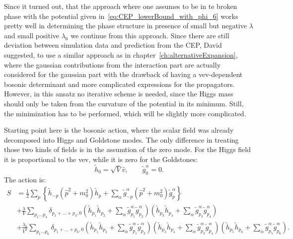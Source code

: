 Since it turned out, that the approach where one assumes to be in te broken phase with the potential given in~\eqref{eq:CEP_lowerBound_with_phi_6} works pretty well in 
determining the phase structure in presence of small but negative  $\lambda$ and small positive $\lambda_6$ we continue from this approach. Since there are still 
deviation between simulation data and prediction from the CEP, David suggested, to use a similar approach as in chapter~\ref{ch:alternativeExpansion}, where the gaussian 
contributions from the interaction part are actually considered for the gaussian part with the drawback of having a vev-dependent bosonic determinant and more complicated 
expressions for the propagators. However, in this ansatz no iterative scheme is needed, since the Higgs mass should only be taken from the curvature of the potential in its
minimum. Still, the minimization has to be performed, which will be slightly more complicated.

Starting point here is the bosonic action, where the scalar field was already decomposed into Higgs and Goldstone modes. The only difference in treating those two 
kinds of fields is in the assumtion of the zero mode. For the Higgs field it is proportional to the vev, while it is zero for the Goldstones:
\begin{equation}\label{eq:def_zeromodes_inBrokenPhase}
 \tilde h_0 = \sqrt{V} \hat v,\quad\quad \tilde g_0^{\alpha}=0.
\end{equation}
The action is:
\begin{align}\label{eq:bosonic_action_in_broken_phase_momentum}
 S & = \frac{1}{2}\sum\limits_{p} \left \{ \tilde h_{-p} \left( \hat p^2 + m_0^2 \right) \tilde h_{p} + 
                \sum\limits_{\alpha} \tilde g^{\alpha}_{-p} \left( \hat p^2 + m_0^2 \right) \tilde g^{\alpha}_{p} \right\}
        \nonumber \\
    & + \frac{\lambda}{V} \sum \limits_{p_1 \dots p_4} \delta_{p_1+ \dots +p_4,0} 
                \left( \tilde h_{p_1} \tilde h_{p_2} + \sum\limits_{\alpha} \tilde g^{\alpha}_{p_1} \tilde g^{\alpha}_{p_2} \right)
                \left( \tilde h_{p_3} \tilde h_{p_4} + \sum\limits_{\alpha} \tilde g^{\alpha}_{p_3} \tilde g^{\alpha}_{p_4} \right)
             \nonumber \\
    & + \frac{\lambda_6}{V^2} \sum \limits_{p_1 \dots p_6} \delta_{p_1+ \dots +p_6,0} 
                \left( \tilde h_{p_1} \tilde h_{p_2} + \sum\limits_{\alpha} \tilde g^{\alpha}_{p_1} \tilde g^{\alpha}_{p_2} \right)
                \left( \tilde h_{p_3} \tilde h_{p_4} + \sum\limits_{\alpha} \tilde g^{\alpha}_{p_3} \tilde g^{\alpha}_{p_4} \right)
                \left( \tilde h_{p_5} \tilde h_{p_6} + \sum\limits_{\alpha} \tilde g^{\alpha}_{p_5} \tilde g^{\alpha}_{p_6} \right).
\end{align}

